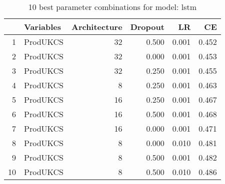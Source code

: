 \begin{table}[ht]
\centering
\begin{tabular}{rlrrrr}
  \hline
 & Variables & Architecture & Dropout & LR & CE \\ 
  \hline
1 & ProdUKCS &   32 & 0.500 & 0.001 & 0.452 \\ 
  2 & ProdUKCS &   32 & 0.000 & 0.001 & 0.453 \\ 
  3 & ProdUKCS &   32 & 0.250 & 0.001 & 0.455 \\ 
  4 & ProdUKCS &    8 & 0.250 & 0.001 & 0.463 \\ 
  5 & ProdUKCS &   16 & 0.250 & 0.001 & 0.467 \\ 
  6 & ProdUKCS &   16 & 0.500 & 0.001 & 0.468 \\ 
  7 & ProdUKCS &   16 & 0.000 & 0.001 & 0.471 \\ 
  8 & ProdUKCS &    8 & 0.000 & 0.010 & 0.481 \\ 
  9 & ProdUKCS &    8 & 0.500 & 0.001 & 0.482 \\ 
  10 & ProdUKCS &    8 & 0.500 & 0.010 & 0.486 \\ 
   \hline
\end{tabular}
\caption{10 best parameter combinations for model: lstm} 
\label{tab:lstm_top_10}
\end{table}
